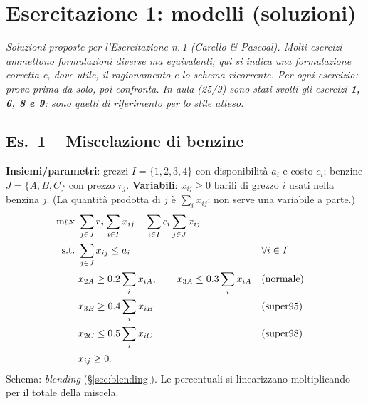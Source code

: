 \chapter{Esercitazione 1: modelli (soluzioni)}\label{cap:es}

\emph{Soluzioni proposte per l'Esercitazione n.\,1 (Carello \& Pascoal). Molti esercizi ammettono formulazioni diverse ma equivalenti; qui si indica una formulazione corretta e, dove utile, il ragionamento e lo schema ricorrente. Per ogni esercizio: prova prima da solo, poi confronta. In aula (25/9) sono stati svolti gli esercizi \textbf{1, 6, 8 e 9}: sono quelli di riferimento per lo stile atteso.}

\section*{Es.\ 1 -- Miscelazione di benzine}
\textbf{Insiemi/parametri}: grezzi $I=\{1,2,3,4\}$ con disponibilità $a_i$ e costo $c_i$; benzine $J=\{A,B,C\}$ con prezzo $r_j$.
\textbf{Variabili}: $x_{ij}\ge0$ barili di grezzo $i$ usati nella benzina $j$. (La quantità prodotta di $j$ è $\sum_ix_{ij}$: non serve una variabile a parte.)
\begin{align*}
\max\ & \sum_{j\in J}r_j\sum_{i\in I}x_{ij}-\sum_{i\in I}c_i\sum_{j\in J}x_{ij}\\
\text{s.t.}\ & \sum_{j\in J}x_{ij}\le a_i && \forall i\in I\\
& x_{2A}\ge0.2\sum_{i}x_{iA},\qquad x_{3A}\le0.3\sum_ix_{iA} &&\text{(normale)}\\
& x_{3B}\ge0.4\sum_ix_{iB} &&\text{(super95)}\\
& x_{2C}\le0.5\sum_ix_{iC} &&\text{(super98)}\\
& x_{ij}\ge0.
\end{align*}
Schema: \emph{blending} (\S\ref{sec:blending}). Le percentuali si linearizzano moltiplicando per il totale della miscela.

